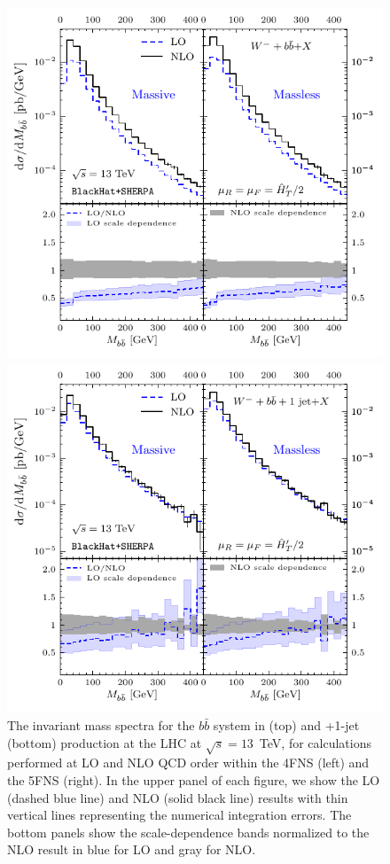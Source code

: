 \begin{figure}[]
\begin{center}
\includegraphics[clip,scale=1]{plots/cmbbwbb}
\end{center}
\begin{center}
\includegraphics[clip,scale=1]{plots/cmbbwbbj}
\end{center}
\caption{The invariant mass spectra for the $b\bar b$ system in \Wbbm{} (top) and
    \Wbbm+1-jet (bottom) production at the LHC at
    $\sqrt{s}=13$~TeV, for calculations performed at LO and NLO QCD order within
    the 4FNS (left) and the 5FNS (right). In the upper panel of each
    figure, we show the LO (dashed blue line) and NLO (solid black
    line) results with thin vertical
    lines representing the numerical integration errors. The bottom panels show
    the scale-dependence bands normalized to the NLO result in blue for LO and
    gray for NLO.}
  \label{fig:Wmmbb}
\end{figure}
